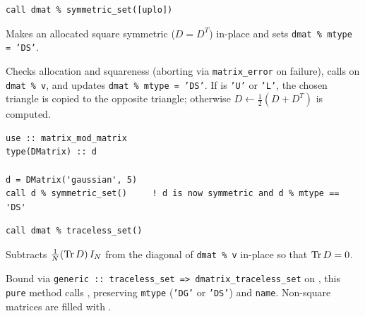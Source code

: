 \lstset{language=[95]Fortran}
\begin{lstlisting}
call dmat % symmetric_set([uplo])
\end{lstlisting}

Makes an allocated square  symmetric ($D = D^T$) in-place and sets \texttt{dmat \% mtype = 'DS'}.

Checks allocation and squareness (aborting via \texttt{matrix\_error} on failure), calls  on \texttt{dmat \% v}, and updates \texttt{dmat \% mtype = 'DS'}. If  is \texttt{'U'} or \texttt{'L'}, the chosen triangle is copied to the opposite triangle; otherwise $D \leftarrow \frac{1}{2}(D + D^T)$ is computed.

\begin{description}[leftmargin=2.2cm, style=nextline]
\end{description}

\lstset{language=[95]Fortran}
\begin{lstlisting}
use :: matrix_mod_matrix
type(DMatrix) :: d

d = DMatrix('gaussian', 5)
call d % symmetric_set()     ! d is now symmetric and d % mtype == 'DS'
\end{lstlisting}


\lstset{language=[95]Fortran}
\begin{lstlisting}
call dmat % traceless_set()
\end{lstlisting}

Subtracts $\frac{1}{N}({\rm Tr\,} D)\, I_N$ from the diagonal of \texttt{dmat \% v} in-place so that ${\rm Tr\,} D = 0$.

Bound via \texttt{generic :: traceless\_set => dmatrix\_traceless\_set} on , this \texttt{pure} method calls , preserving \texttt{mtype} (\texttt{'DG'} or \texttt{'DS'}) and \texttt{name}. Non-square matrices are filled with .

